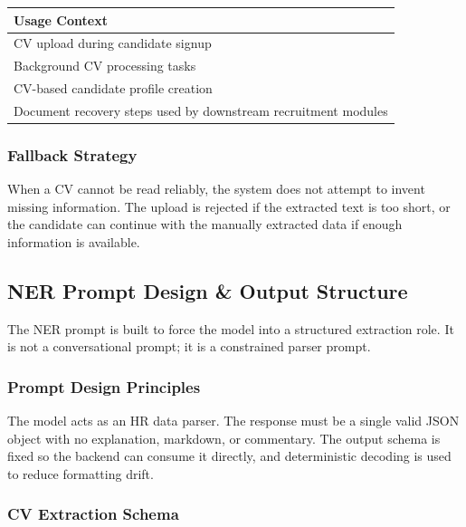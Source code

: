 \begin{center}
\label{tab:pipeline_reuse}
\renewcommand{\arraystretch}{0.8}
\begin{tabularx}{\textwidth}{|l|}
\hline
\rowcolor{gray!20} \textbf{Usage Context} \\
\hline
CV upload during candidate signup \\
\hline
Background CV processing tasks \\
\hline
CV-based candidate profile creation \\
\hline
Document recovery steps used by downstream recruitment modules \\
\hline
\end{tabularx}
\end{center}

\subsubsection{Fallback Strategy}

When a CV cannot be read reliably, the system does not attempt to invent missing information. The upload is rejected if the extracted text is too short, or the candidate can continue with the manually extracted data if enough information is available.

\subsection{NER Prompt Design \& Output Structure}
\label{sec:sprint2:ner_prompt}

The NER prompt is built to force the model into a structured extraction role. It is not a conversational prompt; it is a constrained parser prompt.

\subsubsection{Prompt Design Principles}

The model acts as an HR data parser. The response must be a single valid JSON object with no explanation, markdown, or commentary. The output schema is fixed so the backend can consume it directly, and deterministic decoding is used to reduce formatting drift.

\subsubsection{CV Extraction Schema}

